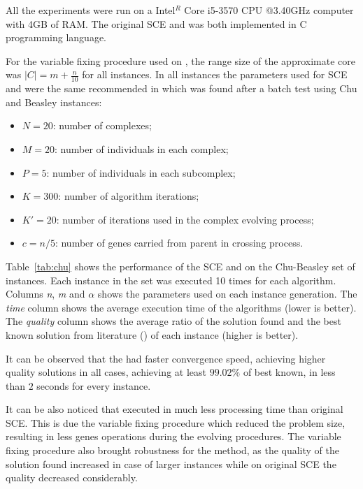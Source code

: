 All the experiments were run on a Intel$^R$ Core i5-3570 CPU @3.40GHz computer
with 4GB of RAM.
The original SCE and \scecore was both implemented in C programming language.

For the variable fixing procedure used on \scecore, the range size of the approximate core was
$|C| = m+\frac{n}{10}$ for all instances.
In all instances the parameters used for SCE and \scecore were the same recommended
in \cite{baroni2015shuffled} which was found after a batch test using Chu and Beasley instances:
\begin{itemize}
  \item $N = 20$: number of complexes;
  \item $M = 20$: number of individuals in each complex;
  \item $P = 5$: number of individuals in each subcomplex;
  \item $K = 300$: number of algorithm iterations;
  \item $K' = 20$: number of iterations used in the complex evolving process;
  \item $c = n/5$: number of genes carried from parent in crossing process.
\end{itemize}

Table~\ref{tab:chu} shows the performance of the SCE and \scecore on the Chu-Beasley set of instances.
Each instance in the set was executed 10 times for each algorithm.
Columns \textit{n}, \textit{m} and \textit{$\alpha$} shows the parameters used
on each instance generation.
The \textit{time} column shows the average execution time of the algorithms (lower is better).
The \textit{quality} column shows the average ratio of the solution found and
the best known solution from literature (\cite{vimont2008reduced, della2012improved}) of each instance (higher is better).

It can be observed that the \scecore had faster convergence speed, achieving higher
quality solutions in all cases, achieving at least $99.02\%$ of best known, in less than $2$ seconds
for every instance.

It can be also noticed that \scecore executed in much less processing time than original
SCE.
This is due the variable fixing procedure which reduced the problem size,
resulting in less genes operations during the evolving procedures.
The variable fixing procedure also brought robustness for the method, as the quality
of the solution found increased in case of larger instances while on original
SCE the quality decreased considerably.


